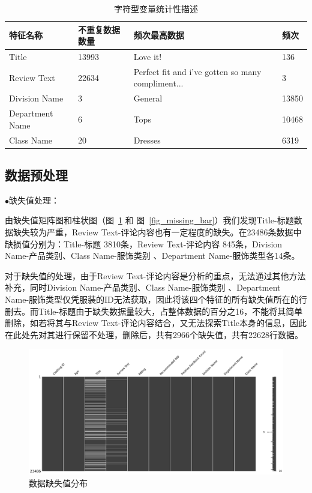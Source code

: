 \documentclass[
  journal=medium,
  manuscript=article-type,
  year=2023,
  volume=37,
]{cup-journal}
\begin{document}
\begin{table}[hbt!]
    \begin{threeparttable}
    \caption{字符型变量统计性描述}
    \label{table_describe_str}
    \begin{tabular}{llll}
    \toprule
    \headrow 特征名称 & 不重复数据数量 & 频次最高数据 & 频次\\
    \midrule
    Title & 13993 & Love it! & 136 \\ 
    \midrule
    Review Text & 22634 & Perfect fit and i've gotten so many compliment... & 3 \\ 
    \midrule
    Division Name & 3 & General & 13850 \\ 
    \midrule
    Department Name & 6 & Tops & 10468 \\
    \midrule
    Class Name & 20 & Dresses & 6319 \\
    \bottomrule 
    \end{tabular}
    \end{threeparttable}
\end{table}


\subsection{数据预处理}  

$\bullet$缺失值处理：

由缺失值矩阵图和柱状图（图~\ref{fig_missing_distribute} 和 图~\ref{fig_missing_bar}）我们发现Title-标题数据缺失较为严重，Review Text-评论内容也有一定程度的缺失。在23486条数据中缺损值分别为：Title-标题 3810条，Review Text-评论内容 845条，Division Name-产品类别、Class Name-服饰类别 、Department Name-服饰类型各14条。

对于缺失值的处理，由于Review Text-评论内容是分析的重点，无法通过其他方法补充，同时Division Name-产品类别、Class Name-服饰类别 、Department Name-服饰类型仅凭服装的ID无法获取，因此将该四个特征的所有缺失值所在的行删去。而Title-标题由于缺失数据量较大，占整体数据的百分之16，不能将其简单删除，如若将其与Review Text-评论内容结合，又无法探索Title本身的信息，因此在此处先对其进行保留不处理，删除后，共有2966个缺失值，共有22628行数据。

\begin{figure}[hbt!]
    \centering
    \includegraphics[width=1.0\linewidth]{缺失值分布.png}
    \caption{数据缺失值分布}
    \label{fig_missing_distribute}
\end{figure}
\end{document}
